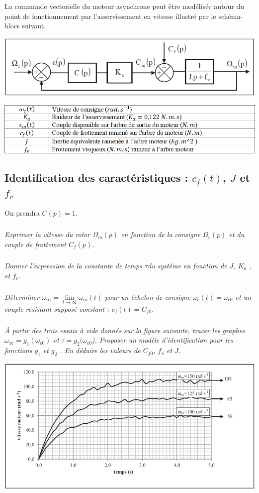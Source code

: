 \documentclass[10pt,fleqn]{article} %
\begin{document}
La commande vectorielle du moteur asynchrone peut être modélisée autour du point de fonctionnement par l’asservissement en vitesse illustré par le schéma-blocs suivant. 
\begin{center}
	\includegraphics[width=\linewidth]{images/fig_01}
\end{center}

\begin{center}
	\includegraphics[width=\linewidth]{images/fig_02}
\end{center}

\subsection{Identification des caractéristiques : $c_f (t)$, $J$ et $f_v$}

On prendra $C(p) = 1$.

\subparagraph{}
\textit{Exprimer la vitesse du rotor $\Omega_m (p)$ en fonction de la consigne $\Omega_c (p)$ et du couple de frottement $C_f (p)$.}

\subparagraph{}
\textit{Donner l’expression de la constante de temps $\tau $du système en fonction de $J$, $K_a$ , et $f_v$.}
	
\subparagraph{}
\textit{Déterminer $\omega_{\infty}=\lim\limits_{t\to \infty} \omega_m (t)$ pour un échelon de consigne $\omega_c (t)=\omega_{c0}$ et un couple résistant supposé constant : $c_f (t)= C_{f0}$.}

\subparagraph{}
\textit{À partir des trois essais à vide donnés sur la figure suivante, tracer les graphes $\omega_{\infty}=g_1 (\omega_{c0})$ et $\tau=g_2 (\omega_{c0}$). Proposer un modèle d’identification pour les fonctions $g_1$ et $g_2$ . En déduire les valeurs de $C_{f0}$, $f_v$ et $J$.} 

\begin{center}
	\includegraphics[width=\linewidth]{images/fig_03}
\end{center}
\end{document}
